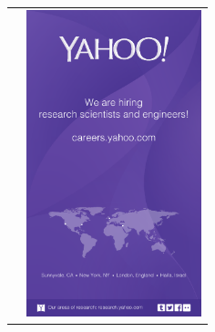 \begin{tabular*}{\textwidth}{@{\extracolsep{\fill}} ll }
& \includegraphics[width=2in]{content/ads/ads/yahoo_quarter_page_version_2}\\
\end{tabular*}

\thispagestyle{empty}
\cleardoublepage
